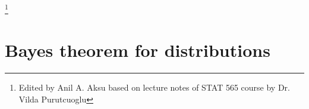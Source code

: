 \documentclass[lecture,12pt,]{pcms-l}
\numberwithin{section}{chapter}
\numberwithin{equation}{chapter}
\theoremstyle{plain}
\theoremstyle{definition}
\theoremstyle{definition}
\begin{document}
\mainmatter
\setcounter{page}{1}




\address{Tubitak Space Technologies Research Institute, Ankara, 06800, Turkey}

\footnote{Edited by Anil A. Aksu based on lecture notes of STAT 565 course by Dr. Vilda Purutcuoglu }



\setcounter{lecture}{0}
\setcounter{chapter}{0}
\tableofcontents




\section{Bayes theorem for distributions}
\end{document}
